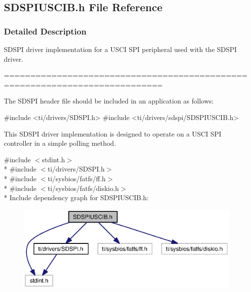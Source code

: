 \subsection{S\+D\+S\+P\+I\+U\+S\+C\+I\+B.\+h File Reference}
\label{_s_d_s_p_i_u_s_c_i_b_8h}


\subsubsection{Detailed Description}
S\+D\+S\+P\+I driver implementation for a U\+S\+C\+I S\+P\+I peripheral used with the S\+D\+S\+P\+I driver. 

============================================================================

The S\+D\+S\+P\+I header file should be included in an application as follows\+: 
\begin{DoxyCode}
\textcolor{preprocessor}{#include <ti/drivers/SDSPI.h>}
\textcolor{preprocessor}{#include <ti/drivers/sdspi/SDSPIUSCIB.h>}
\end{DoxyCode}


This S\+D\+S\+P\+I driver implementation is designed to operate on a U\+S\+C\+I S\+P\+I controller in a simple polling method. 

{\ttfamily \#include $<$stdint.\+h$>$}\\*
{\ttfamily \#include $<$ti/drivers/\+S\+D\+S\+P\+I.\+h$>$}\\*
{\ttfamily \#include $<$ti/sysbios/fatfs/ff.\+h$>$}\\*
{\ttfamily \#include $<$ti/sysbios/fatfs/diskio.\+h$>$}\\*
Include dependency graph for S\+D\+S\+P\+I\+U\+S\+C\+I\+B.\+h\+:
\nopagebreak
\begin{figure}[H]
\begin{center}
\leavevmode
\includegraphics[width=350pt]{_s_d_s_p_i_u_s_c_i_b_8h__incl}
\end{center}
\end{figure}
